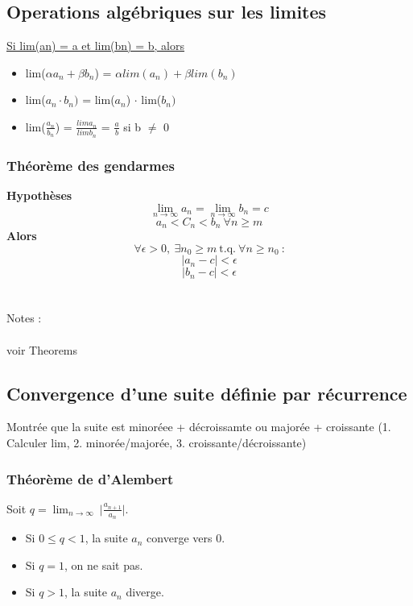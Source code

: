 \documentclass{article}
\begin{document}
\subsection{Operations algébriques sur les limites}
\underline{Si lim(an) = a et lim(bn) = b, alors}\\
\begin{itemize}
    \item lim($\alpha a_n + \beta b_n$) = $\alpha lim(a_n) + \beta lim(b_n)$
    \item lim($a_n \cdot b_n)$ = lim($a_n$) $\cdot$ lim($b_n)$
    \item lim($\frac{a_n}{b_n}$) = $\frac{lima_n}{limb_n}$ = $\frac{a}{b}$ si b $\neq$ 0
\end{itemize}
\subsubsection{Théorème des gendarmes}

\textbf{Hypothèses} \\
\[ \lim_{n\to\infty}a_n = \lim_{n\to\infty}b_n = c \]
\[ a_n < C_n < b_n\ \forall n \geq m \]
\textbf{Alors} \\

\[ \forall \epsilon > 0,\ \exists n_0 \geq m\ \text{t.q.}\ \forall n \geq n_0\ \text{:} \]
\[ \lvert a_n - c \lvert < \epsilon \]
\[ \lvert b_n - c \lvert < \epsilon \] \\\\
Notes :\\\\
voir Theorems
\subsection{Convergence d'une suite définie par récurrence}
Montrée que la suite est minoréee + décroissamte ou majorée + croissante
(1. Calculer lim, 2. minorée/majorée, 3. croissante/décroissante)

\subsubsection{Théorème de d'Alembert}

Soit $ q = \lim_{n\to\infty}\ \lvert \frac{a_{n+1}}{a_n} \lvert $.\\
\begin{itemize}
    \item Si $ 0 \leq q < 1 $, la suite $ a_n $ converge vers 0.
    \item Si $ q = 1 $, on ne sait pas.
    \item Si $ q > 1 $, la suite $ a_n $ diverge.
\end{itemize}
\end{document}
